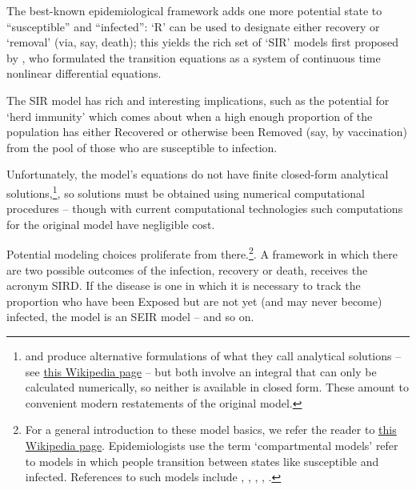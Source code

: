 The best-known epidemiological framework adds one more potential state to ``susceptible'' and ``infected'':  `R' can be used to designate either recovery or `removal' (via, say, death); this yields the rich set of `SIR' models first proposed by \cite{kermack_contribution_1927}, who formulated the transition equations as a system of continuous time nonlinear differential equations.

The SIR model has rich and interesting implications, such as the potential for `herd immunity' which comes about when a high enough proportion of the population has either Recovered or otherwise been Removed (say, by vaccination) from the pool of those who are susceptible to infection.

Unfortunately, the model's equations do not have finite closed-form analytical solutions,\footnote{\cite{miller2012note} and \cite{harko2014exact}  produce alternative formulations of what they call analytical solutions -- see   \href{https://en.wikipedia.org/wiki/Compartmental_models_in_epidemiology\#Transition_rates}{this Wikipedia page} -- but both involve an integral that can only be calculated numerically, so neither is available in closed form.  These amount to convenient modern restatements of the original \cite{kermack_contribution_1927} model.}, so solutions must be obtained using numerical computational procedures -- though with current computational technologies such computations for the original \cite{kermack_contribution_1927} model have negligible cost.

Potential modeling choices proliferate from there.\footnote{For a general introduction to these model basics, we refer the reader to \href{https://en.wikipedia.org/wiki/Compartmental_models_in_epidemiology\#Transition_rates}{this Wikipedia page}. Epidemiologists use the term `compartmental models' refer to models in which people transition between states like susceptible and infected.  References to such models include	 \href{https://royalsocietypublishing.org/doi/10.1098/rspa.1927.0118}{\cite{kermack_contribution_1927}},  \href{https://www.ncbi.nlm.nih.gov/pmc/articles/PMC3710332/}{\cite{bailey1975mathematical}}, \href{https://www.amazon.com/Infectious-Diseases-Humans-Dynamics-Control/dp/019854040X}{\cite{anderson_infectious_1992}}, \href{https://epubs.siam.org/doi/abs/10.1137/S0036144500371907}{\cite{hethcote_mathematics_2000}}, \href{https://www.ncbi.nlm.nih.gov/pmc/articles/PMC6001967/}{\cite{brauer2017mathematical}}.}.  A framework in which there are two possible outcomes of the infection, recovery or death, receives the acronym SIRD.  If the disease is one in which it is necessary to track the proportion who have been Exposed but are not yet (and may never become) infected, the model is an SEIR model -- and so on.

